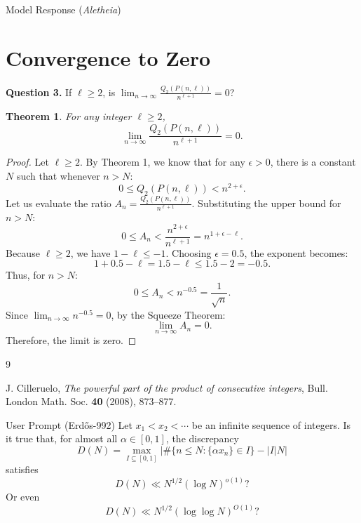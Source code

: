\documentclass[11pt]{article}
\newcommand{\Qtwo}{Q_2}
\newtheorem{theorem}{Theorem}
\begin{document}
\begin{solution}{Model Response (\emph{Aletheia})}
\section{Convergence to Zero}

\textbf{Question 3.} If $\ell \ge 2$, is $\lim_{n \to \infty} \frac{\Qtwo(P(n, \ell))}{n^{\ell+1}} = 0$?

\begin{theorem}
For any integer $\ell \ge 2$,
\[ \lim_{n \to \infty} \frac{\Qtwo(P(n, \ell))}{n^{\ell+1}} = 0. \]
\end{theorem}

\begin{proof}
Let $\ell \ge 2$. By Theorem 1, we know that for any $\epsilon > 0$, there is a constant $N$ such that whenever $n > N$:
\[ 0 \le \Qtwo(P(n, \ell)) < n^{2+\epsilon}. \]
Let us evaluate the ratio $A_n = \frac{\Qtwo(P(n, \ell))}{n^{\ell+1}}$.
Substituting the upper bound for $n > N$:
\[ 0 \le A_n < \frac{n^{2+\epsilon}}{n^{\ell+1}} = n^{1+\epsilon - \ell}. \]
Because $\ell \ge 2$, we have $1 - \ell \le -1$.
Choosing $\epsilon = 0.5$, the exponent becomes:
\[ 1 + 0.5 - \ell = 1.5 - \ell \le 1.5 - 2 = -0.5. \]
Thus, for $n > N$:
\[ 0 \le A_n < n^{-0.5} = \frac{1}{\sqrt{n}}. \]
Since $\lim_{n \to \infty} n^{-0.5} = 0$, by the Squeeze Theorem:
\[ \lim_{n \to \infty} A_n = 0. \]
Therefore, the limit is zero.
\end{proof}

\begin{thebibliography}{9}

J. Cilleruelo, \textit{The powerful part of the product of consecutive integers}, Bull. London Math. Soc. \textbf{40} (2008), 873--877.

\end{thebibliography}
\end{solution}

\begin{problem}{User Prompt (Erd\H{o}s-992)}
Let $x_1<x_2<\cdots$ be an infinite sequence of integers. Is it true that, for almost all $\alpha \in [0,1]$, the discrepancy\[D(N)=\max_{I\subseteq [0,1]} \lvert \#\{ n\leq N : \{ \alpha x_n\}\in I\} - \lvert I\rvert N\rvert\]satisfies\[D(N) \ll N^{1/2}(\log N)^{o(1)}?\]Or even\[D(N)\ll N^{1/2}(\log\log N)^{O(1)}?\]
\end{problem}
\end{document}

